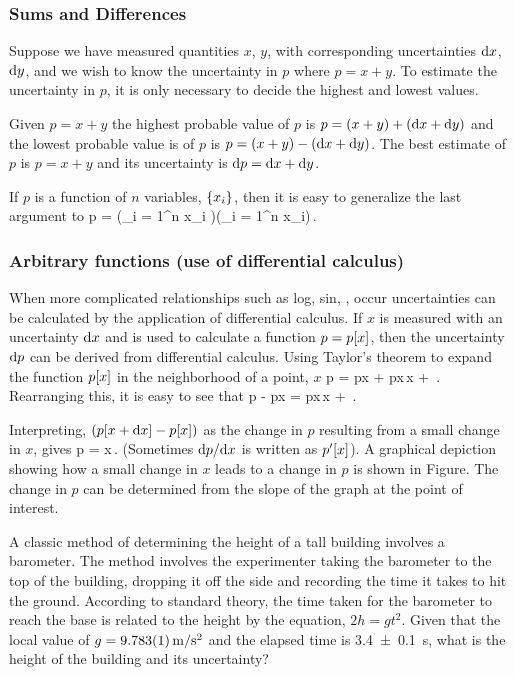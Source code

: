 \subsubsection{Sums and Differences}
Suppose we have measured quantities $x$, $y$, with corresponding uncertainties $\text{d} x$, $\text{d} y$, and we wish to know the uncertainty in $p$ where $p = x + y$. To estimate the uncertainty in $p$, it is only necessary to decide the highest and lowest values.

Given $p = x + y$ the highest probable value of $p$ is $p = (x + y) + (\text{d} x + \text{d} y)$ and the lowest probable value is of $p$ is $p = (x + y) - (\text{d} x + \text{d} y)$. The best estimate of $p$ is $p = x + y$ and its uncertainty is $\text{d} p = \text{d} x + \text{d} y$.

If $p$ is a function of $n$ variables, $\left\lbrace{x_i}\right\rbrace$, then it is easy to generalize the last argument to
\beq
p = \left(\sum_{i = 1}^n x_i \right)\pm\left(\sum_{i = 1}^n \dx x_i\right)\,.
\eeq


\subsubsection{Arbitrary functions (use of differential calculus)}
When more complicated relationships such as log, sin, \etc, occur uncertainties can be calculated by the application of differential calculus. If $x$ is measured with an uncertainty $\text{d} x$ and is used to calculate a function $p = p\!\left[{x}\right]$, then the uncertainty $\text{d} p$ can be derived from differential calculus. Using Taylor's theorem to expand the function $p\!\left[{x}\right]$ in the neighborhood of a point, $x$
\beq
p = p\vat x + \xod px\,\dx x + \dotsb\,.
\eeq
Rearranging this, it is easy to see that
\beq
p - p\vat x = \xod px\,\dx x + \dotsb\,.
\eeq

Interpreting, $\left(p\!\left[{x + \text{d} x}\right] - p\!\left[{x}\right]\right)$ as the change in $p$ resulting from a small change in $x$, gives
\beq
\dx p = \bigg\vert{}\bigg\vert\dx x\,.
\eeq
(Sometimes $\text{d} p/\text{d} x$ is written as $p'\!\left[{x}\right]$). A graphical depiction showing how a small change in $x$ leads to a change in $p$ is shown in Figure. The change in $p$ can be determined from the slope of the graph at the point of interest.


\begin{example}
A classic method of determining the height of a tall building involves a barometer. The method involves the experimenter taking the barometer to the top of the building, dropping it off the side and recording the time it takes to hit the ground. According to standard theory, the time taken for the barometer to reach the base is related to the height by the equation, $2h = gt^2$. Given that the local value of $g = \SI{9.783+-0.001}{m/s^2}$ and the elapsed time is \SI{3.4+-0.1}{s}, what is the height of the building and its uncertainty?
\end{example}

